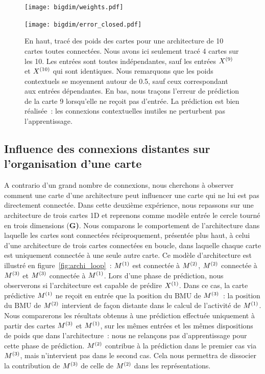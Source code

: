 \documentclass[../main]{subfiles}
\begin{document}
\begin{figure}[h!]
	\begin{minipage}{\textwidth}
	\texttt{[image: bigdim/weights.pdf]}
	\end{minipage}
\begin{minipage}{\textwidth}
	\centering\texttt{[image: bigdim/error\_closed.pdf]}
	\caption{En haut, tracé des poids des cartes pour une architecture de 10 cartes toutes connectées. Nous avons ici seulement tracé 4 cartes sur les 10. Les entrées sont toutes indépendantes, sauf les entrées $X^{({9})}$ et $X^{({10})}$ qui sont identiques. Nous remarquons que les poids contextuels se moyennent autour de 0.5, sauf ceux correspondant aux entrées dépendantes. En bas, nous traçons l'erreur de prédiction de la carte 9 lorsqu'elle ne reçoit pas d'entrée. La prédiction est bien réalisée~: les connexions contextuelles inutiles ne perturbent pas l'apprentissage. \label{fig:bigdim}}
\end{minipage}
\end{figure}

\subsection{Influence des connexions distantes sur l'organisation d'une carte}

A contrario d'un grand nombre de connexions, nous cherchons à observer comment une carte d'une architecture peut influencer une carte qui ne lui est pas directement connectée.
Dans cette deuxième expérience, nous repassons sur une architecture de trois cartes 1D et reprenons comme modèle entrée le cercle tourné en trois dimensions (\textbf{G)}. 
Nous comparons le comportement de l'architecture dans laquelle les cartes sont connectées réciproquement, présentée plus haut, à celui d'une architecture de trois cartes connectées en boucle, dans laquelle chaque carte est uniquement connectée à une seule autre carte. 
Ce modèle d'architecture est illustré en figure~\ref{fig:archi_loop}~: $M^{({1})}$ est connectée à $M^{({2})}$, $M^{({2})}$ connectée à $M^{({3})}$ et $M^{({3})}$ connectée à $M^{({1})}$.
Lors d'une phase de prédiction, nous observerons si l'architecture est capable de prédire $X^{({1})}$. Dans ce cas, la carte prédictive $M^{({1})}$ ne reçoit en entrée que la position du BMU de $M^{({3})}$~: la position du BMU de $M^{({2})}$ intervient de façon distante dans le calcul de l'activité de $M^{({1})}$.
Nous comparerons les résultats obtenus à une prédiction effectuée uniquement à partir des cartes $M^{({3})}$ et $M^{({1})}$, sur les mêmes entrées et les mêmes dispositions de poids que dans l'architecture~: nous ne relançons pas d'apprentissage pour cette phase de prédiction.
$M^{({2})}$ contribue à la prédiction dans le premier cas via $M^{({3})}$, mais n'intervient pas dans le second cas.
Cela nous permettra de dissocier la contribution de $M^{({3})}$ de celle de $M^{({2})}$ dans les représentations.
\end{document}
